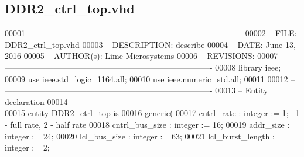 \subsection{D\+D\+R2\+\_\+ctrl\+\_\+top.\+vhd}
\label{DDR2__ctrl__top_8vhd_source}

\begin{DoxyCode}
00001 \textcolor{keyword}{-- ---------------------------------------------------------------------------- }
00002 \textcolor{keyword}{-- FILE:    DDR2\_ctrl\_top.vhd}
00003 \textcolor{keyword}{-- DESCRIPTION: describe}
00004 \textcolor{keyword}{-- DATE:    June 13, 2016}
00005 \textcolor{keyword}{-- AUTHOR(s):   Lime Microsystems}
00006 \textcolor{keyword}{-- REVISIONS:}
00007 \textcolor{keyword}{-- ---------------------------------------------------------------------------- }
00008 \textcolor{vhdlkeyword}{library }\textcolor{keywordflow}{ieee};
00009 \textcolor{vhdlkeyword}{use }ieee.std\_logic\_1164.\textcolor{keywordflow}{all};
00010 \textcolor{vhdlkeyword}{use }ieee.numeric\_std.\textcolor{keywordflow}{all};
00011 
00012 \textcolor{keyword}{-- ----------------------------------------------------------------------------}
00013 \textcolor{keyword}{-- Entity declaration}
00014 \textcolor{keyword}{-- ----------------------------------------------------------------------------}
00015 \textcolor{keywordflow}{entity }DDR2_ctrl_top \textcolor{keywordflow}{is}
00016         \textcolor{keywordflow}{generic}\textcolor{vhdlchar}{(}
00017             \textcolor{vhdlchar}{cntrl_rate}          \textcolor{vhdlchar}{:} \textcolor{comment}{integer} \textcolor{vhdlchar}{:=} \textcolor{vhdllogic}{}\textcolor{vhdllogic}{1};\textcolor{keyword}{ --1 - full rate, 2 - half rate}
00018             \textcolor{vhdlchar}{cntrl_bus_size}      \textcolor{vhdlchar}{:} \textcolor{comment}{integer} \textcolor{vhdlchar}{:=} \textcolor{vhdllogic}{}\textcolor{vhdllogic}{16};
00019             \textcolor{vhdlchar}{addr_size}           \textcolor{vhdlchar}{:} \textcolor{comment}{integer} \textcolor{vhdlchar}{:=} \textcolor{vhdllogic}{}\textcolor{vhdllogic}{24};
00020             \textcolor{vhdlchar}{lcl_bus_size}        \textcolor{vhdlchar}{:} \textcolor{comment}{integer} \textcolor{vhdlchar}{:=} \textcolor{vhdllogic}{}\textcolor{vhdllogic}{63};
00021             \textcolor{vhdlchar}{lcl_burst_length}    \textcolor{vhdlchar}{:} \textcolor{comment}{integer} \textcolor{vhdlchar}{:=} \textcolor{vhdllogic}{}\textcolor{vhdllogic}{2};

\end{DoxyCode}
